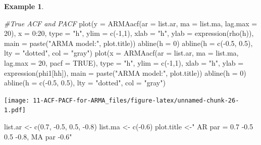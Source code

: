 \documentclass[
]{book}
\newenvironment{Shaded}{\begin{snugshade}}{\end{snugshade}}
\newcommand{\AttributeTok}[1]{\textcolor[rgb]{0.77,0.63,0.00}{#1}}
\newcommand{\CommentTok}[1]{\textcolor[rgb]{0.56,0.35,0.01}{\textit{#1}}}
\newcommand{\ConstantTok}[1]{\textcolor[rgb]{0.00,0.00,0.00}{#1}}
\newcommand{\DecValTok}[1]{\textcolor[rgb]{0.00,0.00,0.81}{#1}}
\newcommand{\FloatTok}[1]{\textcolor[rgb]{0.00,0.00,0.81}{#1}}
\newcommand{\FunctionTok}[1]{\textcolor[rgb]{0.00,0.00,0.00}{#1}}
\newcommand{\NormalTok}[1]{#1}
\newcommand{\OtherTok}[1]{\textcolor[rgb]{0.56,0.35,0.01}{#1}}
\newcommand{\SpecialCharTok}[1]{\textcolor[rgb]{0.00,0.00,0.00}{#1}}
\newcommand{\StringTok}[1]{\textcolor[rgb]{0.31,0.60,0.02}{#1}}
\theoremstyle{definition}
\theoremstyle{definition}
\newtheorem{example}{Example}[chapter]
\theoremstyle{definition}
\theoremstyle{definition}
\theoremstyle{remark}
\begin{document}
\begin{example}
\begin{Shaded}
\begin{Highlighting}[]
  
  \CommentTok{\#True ACF and PACF}
  \FunctionTok{plot}\NormalTok{(}\AttributeTok{y =} \FunctionTok{ARMAacf}\NormalTok{(}\AttributeTok{ar =}\NormalTok{ list.ar, }\AttributeTok{ma =}\NormalTok{ list.ma, }\AttributeTok{lag.max =} \DecValTok{20}\NormalTok{), }\AttributeTok{x =} \DecValTok{0}\SpecialCharTok{:}\DecValTok{20}\NormalTok{, }\AttributeTok{type =} \StringTok{"h"}\NormalTok{, }\AttributeTok{ylim =} \FunctionTok{c}\NormalTok{(}\SpecialCharTok{{-}}\DecValTok{1}\NormalTok{,}\DecValTok{1}\NormalTok{), }\AttributeTok{xlab =} \StringTok{"h"}\NormalTok{, }\AttributeTok{ylab =} \FunctionTok{expression}\NormalTok{(}\FunctionTok{rho}\NormalTok{(h)),}
    \AttributeTok{main =} \FunctionTok{paste}\NormalTok{(}\StringTok{"ARMA model:"}\NormalTok{, plot.title))}
  \FunctionTok{abline}\NormalTok{(}\AttributeTok{h =} \DecValTok{0}\NormalTok{)}
  \FunctionTok{abline}\NormalTok{(}\AttributeTok{h =} \FunctionTok{c}\NormalTok{(}\SpecialCharTok{{-}}\FloatTok{0.5}\NormalTok{, }\FloatTok{0.5}\NormalTok{), }\AttributeTok{lty =} \StringTok{"dotted"}\NormalTok{, }\AttributeTok{col =} \StringTok{"gray"}\NormalTok{)}
  \FunctionTok{plot}\NormalTok{(}\AttributeTok{x =} \FunctionTok{ARMAacf}\NormalTok{(}\AttributeTok{ar =}\NormalTok{ list.ar, }\AttributeTok{ma =}\NormalTok{ list.ma, }\AttributeTok{lag.max =} \DecValTok{20}\NormalTok{, }\AttributeTok{pacf =} \ConstantTok{TRUE}\NormalTok{), }\AttributeTok{type =} \StringTok{"h"}\NormalTok{, }\AttributeTok{ylim =} \FunctionTok{c}\NormalTok{(}\SpecialCharTok{{-}}\DecValTok{1}\NormalTok{,}\DecValTok{1}\NormalTok{), }\AttributeTok{xlab =} \StringTok{"h"}\NormalTok{, }\AttributeTok{ylab =} \FunctionTok{expression}\NormalTok{(phi1[hh]),}
    \AttributeTok{main =} \FunctionTok{paste}\NormalTok{(}\StringTok{"ARMA model:"}\NormalTok{, plot.title))}
  \FunctionTok{abline}\NormalTok{(}\AttributeTok{h =} \DecValTok{0}\NormalTok{)}
  \FunctionTok{abline}\NormalTok{(}\AttributeTok{h =} \FunctionTok{c}\NormalTok{(}\SpecialCharTok{{-}}\FloatTok{0.5}\NormalTok{, }\FloatTok{0.5}\NormalTok{), }\AttributeTok{lty =} \StringTok{"dotted"}\NormalTok{, }\AttributeTok{col =} \StringTok{"gray"}\NormalTok{)}
\end{Highlighting}
\end{Shaded}

\texttt{[image: 11-ACF-PACF-for-ARMA\_files/figure-latex/unnamed-chunk-26-1.pdf]}

\begin{Shaded}
\begin{Highlighting}[]
\NormalTok{list.ar }\OtherTok{\textless{}{-}} \FunctionTok{c}\NormalTok{(}\FloatTok{0.7}\NormalTok{, }\SpecialCharTok{{-}}\FloatTok{0.5}\NormalTok{, }\FloatTok{0.5}\NormalTok{, }\SpecialCharTok{{-}}\FloatTok{0.8}\NormalTok{)}
\NormalTok{list.ma }\OtherTok{\textless{}{-}} \FunctionTok{c}\NormalTok{(}\SpecialCharTok{{-}}\FloatTok{0.6}\NormalTok{)}
\NormalTok{plot.title }\OtherTok{\textless{}{-}}\StringTok{" AR par = 0.7 {-}0.5 0.5 {-}0.8, MA par {-}0.6"}
\end{Highlighting}
\end{Shaded}


\end{example}
\end{document}
